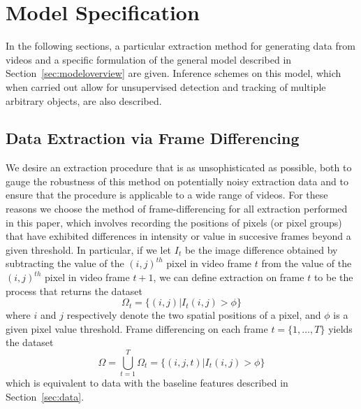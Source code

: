 \documentclass[smallcondensed, final]{svjour3}
\begin{document}

\section{Model Specification}
\label{sec:modelspec}

In the following sections, a particular extraction method for generating data from videos and a specific formulation of the general model described in Section~\ref{sec:modeloverview} are given. Inference schemes on this model, which when carried out allow for unsupervised detection and tracking of multiple arbitrary objects, are also described.






\subsection{Data Extraction via Frame Differencing}
\label{sec:modelspec_extraction}

We desire an extraction procedure that is as unsophisticated as possible, both to gauge the robustness of this method on potentially noisy extraction data and to ensure that the procedure is applicable to a wide range of videos. For these reasons we choose the method of frame-differencing for all extraction performed in this paper, which involves recording the positions of pixels (or pixel groups) that have exhibited differences in intensity or value in succesive frames beyond a given threshold. In particular, if we let $I_{t}$ be the image difference obtained by subtracting the value of the $(i,j)^{th}$ pixel in video frame $t$ from the value of the $(i,j)^{th}$ pixel in video frame $t+1$, we can define extraction on frame $t$ to be the process that returns the dataset
\begin{equation}
	\Omega_{t} = \{ (i,j) | I_{t}(i,j) > \phi \}
\end{equation}
where $i$ and $j$ respectively denote the two spatial positions of a pixel, and $\phi$ is a given pixel value threshold. Frame differencing on each frame $t =\{1, \ldots, T \}$ yields the dataset
\begin{equation}
	\Omega = \bigcup_{t=1}^{T} \Omega_{t} = \{ (i,j,t) | I_{t}(i,j) > \phi \}
\end{equation}
which is equivalent to data with the baseline features described in Section~\ref{sec:data}.
\end{document}
